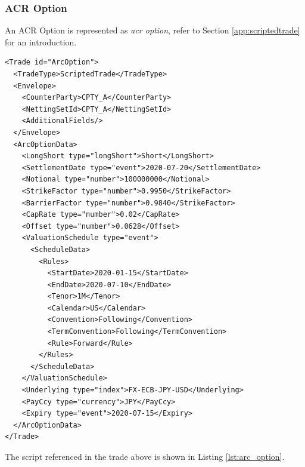 \subsubsection{ACR Option}


An ACR Option is represented as {\em acr option}, refer to Section
\ref{app:scriptedtrade} for an introduction.

\begin{verbatim}
<Trade id="ArcOption">
  <TradeType>ScriptedTrade</TradeType>
  <Envelope>
    <CounterParty>CPTY_A</CounterParty>
    <NettingSetId>CPTY_A</NettingSetId>
    <AdditionalFields/>
  </Envelope>
  <ArcOptionData>
    <LongShort type="longShort">Short</LongShort>
    <SettlementDate type="event">2020-07-20</SettlementDate>
    <Notional type="number">100000000</Notional>
    <StrikeFactor type="number">0.9950</StrikeFactor>
    <BarrierFactor type="number">0.9840</StrikeFactor>
    <CapRate type="number">0.02</CapRate>
    <Offset type="number">0.0628</Offset>
    <ValuationSchedule type="event">
      <ScheduleData>
        <Rules>
          <StartDate>2020-01-15</StartDate>
          <EndDate>2020-07-10</EndDate>
          <Tenor>1M</Tenor>
          <Calendar>US</Calendar>
          <Convention>Following</Convention>
          <TermConvention>Following</TermConvention>
          <Rule>Forward</Rule>
        </Rules>
      </ScheduleData>
    </ValuationSchedule>
    <Underlying type="index">FX-ECB-JPY-USD</Underlying>
    <PayCcy type="currency">JPY</PayCcy>
    <Expiry type="event">2020-07-15</Expiry>
  </ArcOptionData>
</Trade>
\end{verbatim}

The script referenced in the trade above is shown in Listing \ref{lst:arc_option}.

